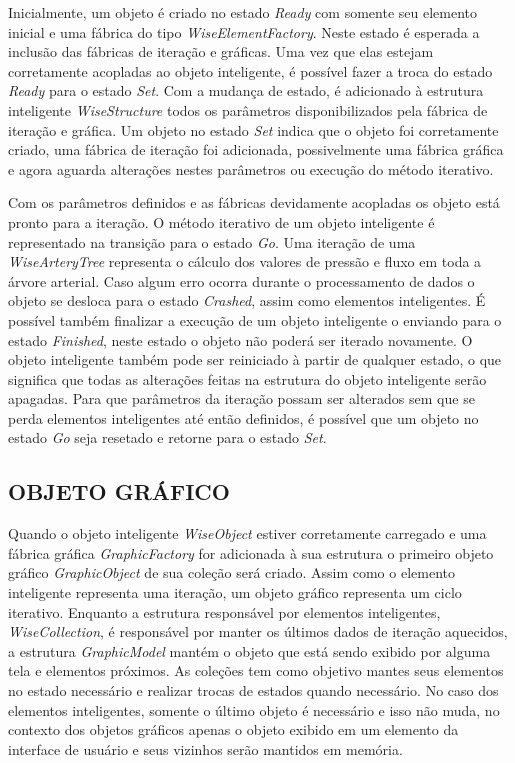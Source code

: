 \documentclass[a4paper,12pt]{monografia}
\theoremstyle{plain}
\theoremstyle{definition}
\theoremstyle{remark}
\begin{document}
Inicialmente, um objeto é criado no estado \textit{Ready} com somente seu elemento inicial e uma fábrica do tipo \textit{WiseElementFactory}. Neste estado é esperada a inclusão das fábricas de iteração e gráficas. Uma vez que elas estejam corretamente acopladas ao objeto inteligente, é possível fazer a troca do estado \textit{Ready} para o estado \textit{Set}. Com a mudança de estado, é adicionado à estrutura inteligente \textit{WiseStructure} todos os parâmetros disponibilizados pela fábrica de iteração e gráfica. Um objeto no estado \textit{Set} indica que o objeto foi corretamente criado, uma fábrica de iteração foi adicionada, possivelmente uma fábrica gráfica e agora aguarda alterações nestes parâmetros ou execução do método iterativo.

Com os parâmetros definidos e as fábricas devidamente acopladas os objeto está pronto para a iteração. O método iterativo de um objeto inteligente é representado na transição para o estado \textit{Go}. Uma iteração de uma \textit{WiseArteryTree} representa o cálculo dos valores de pressão e fluxo em toda a árvore arterial. Caso algum erro ocorra durante o processamento de dados o objeto se desloca para o estado \textit{Crashed}, assim como elementos inteligentes. É possível também finalizar a execução de um objeto inteligente o enviando para o estado \textit{Finished}, neste estado o objeto não poderá ser iterado novamente. O objeto inteligente também pode ser reiniciado à partir de qualquer estado, o que significa que todas as alterações feitas na estrutura do objeto inteligente serão apagadas. Para que parâmetros da iteração possam ser alterados sem que se perda elementos inteligentes até então definidos, é possível que um objeto no estado \textit{Go} seja resetado e retorne para o estado \textit{Set}.

\subsection{OBJETO GRÁFICO}\label{sec:objeto_grafico}


Quando o objeto inteligente \textit{WiseObject} estiver corretamente carregado e uma fábrica gráfica \textit{GraphicFactory} for adicionada à sua estrutura o primeiro objeto gráfico \textit{GraphicObject} de sua coleção será criado. Assim como o elemento inteligente representa uma iteração, um objeto gráfico representa um ciclo iterativo. Enquanto a estrutura responsável por elementos inteligentes, \textit{WiseCollection}, é responsável por manter os últimos dados de iteração aquecidos, a estrutura \textit{GraphicModel} mantém o objeto que está sendo exibido por alguma tela e elementos próximos. As coleções tem como objetivo mantes seus elementos no estado necessário e realizar trocas de estados quando necessário. No caso dos elementos inteligentes, somente o último objeto é necessário e isso não muda, no contexto dos objetos gráficos apenas o objeto exibido em um elemento da interface de usuário e seus vizinhos serão mantidos em memória.
\end{document}
